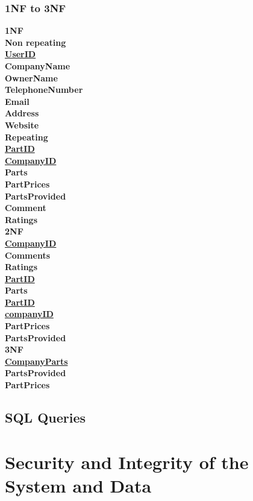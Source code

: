 \subsubsection{1NF to 3NF}
\bf{1NF}\\
Non repeating\\
\newline
\underline{UserID}\\
CompanyName\\
OwnerName\\
TelephoneNumber\\
Email\\
Address\\
Website\\
\newline
Repeating\\
\newline
\underline{PartID}\\
\underline{CompanyID}\\
Parts\\
PartPrices\\
PartsProvided\\
Comment\\
Ratings\\
\newline
\bf{2NF}\\
\underline{CompanyID}\\
Comments\\
Ratings\\
\newline
\underline{PartID}\\
Parts\\
\newline
\underline{PartID}\\
\underline{companyID}\\
PartPrices\\
PartsProvided\\
\newline
\bf{3NF}\\
\underline{CompanyParts}\\
PartsProvided\\
PartPrices\\

\subsection{SQL Queries}

\section{Security and Integrity of the System and Data}

